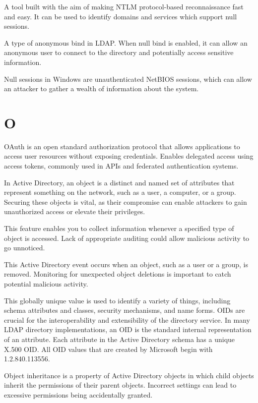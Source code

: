  A tool built with the aim of making NTLM protocol-based reconnaissance fast and easy. It can be used to identify domains and services which support null sessions.

 A type of anonymous bind in LDAP. When null bind is enabled, it can allow an anonymous user to connect to the directory and potentially access sensitive information.

 Null sessions in Windows are unauthenticated NetBIOS sessions, which can allow an attacker to gather a wealth of information about the system.

\section*{O}
 OAuth is an open standard authorization protocol that allows applications to access user resources without exposing credentials. Enables delegated access using access tokens, commonly used in APIs and federated authentication systems.

 In Active Directory, an object is a distinct and named set of attributes that represent something on the network, such as a user, a computer, or a group. Securing these objects is vital, as their compromise can enable attackers to gain unauthorized access or elevate their privileges.

 This feature enables you to collect information whenever a specified type of object is accessed. Lack of appropriate auditing could allow malicious activity to go unnoticed.

 This Active Directory event occurs when an object, such as a user or a group, is removed. Monitoring for unexpected object deletions is important to catch potential malicious activity.

 This globally unique value is used to identify a variety of things, including schema attributes and classes, security mechanisms, and name forms. OIDs are crucial for the interoperability and extensibility of the directory service. In many LDAP directory implementations, an OID is the standard internal representation of an attribute. Each attribute in the Active Directory schema has a unique X.500 OID. All OID values that are created by Microsoft begin with 1.2.840.113556.

 Object inheritance is a property of Active Directory objects in which child objects inherit the permissions of their parent objects. Incorrect settings can lead to excessive permissions being accidentally granted.

